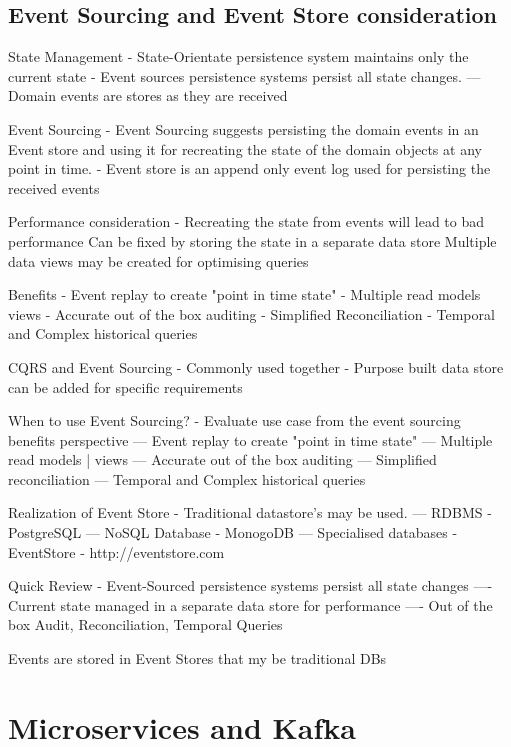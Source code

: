 
\section{Event Sourcing and Event Store consideration}

State Management
- State-Orientate persistence system maintains only the current state
- Event sources persistence systems persist all state changes.
--- Domain events are stores as they are received

Event Sourcing
- Event Sourcing suggests persisting the domain events in an Event store and using it for recreating the state of the domain objects at any point in time.
- Event store is an append only event log used for persisting the received events

Performance consideration - Recreating the state from events will lead to bad performance
Can be fixed by storing the state in a separate data store
Multiple data views may be created for optimising queries

Benefits
- Event replay to create "point in time state"
- Multiple read models views
- Accurate out of the box auditing
- Simplified Reconciliation
- Temporal and Complex historical queries

CQRS and Event Sourcing
- Commonly used together
- Purpose built data store can be added for specific requirements

When to use Event Sourcing?
- Evaluate use case from the event sourcing benefits perspective
--- Event replay to create "point in time state"
--- Multiple read models | views
--- Accurate out of the box auditing
--- Simplified reconciliation
--- Temporal and Complex historical queries

Realization of Event Store
- Traditional datastore's may be used.
--- RDBMS - PostgreSQL
--- NoSQL Database - MonogoDB
--- Specialised databases - EventStore - http://eventstore.com

Quick Review
- Event-Sourced persistence systems persist all state changes
---- Current state managed in a separate data store for performance
---- Out of the box Audit, Reconciliation, Temporal Queries

Events are stored in Event Stores that my be traditional DBs

\chapter{Microservices and Kafka}

